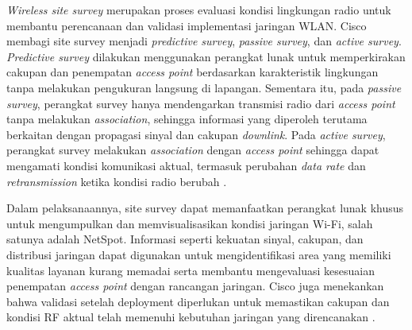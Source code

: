 \textit{Wireless site survey} merupakan proses evaluasi kondisi lingkungan radio untuk membantu perencanaan dan validasi implementasi jaringan WLAN. Cisco membagi site survey menjadi \textit{predictive survey}, \textit{passive survey}, dan \textit{active survey}. \textit{Predictive survey} dilakukan menggunakan perangkat lunak untuk memperkirakan cakupan dan penempatan \textit{access point} berdasarkan karakteristik lingkungan tanpa melakukan pengukuran langsung di lapangan. Sementara itu, pada \textit{passive survey}, perangkat survey hanya mendengarkan transmisi radio dari \textit{access point} tanpa melakukan \textit{association}, sehingga informasi yang diperoleh terutama berkaitan dengan propagasi sinyal dan cakupan \textit{downlink}. Pada \textit{active survey}, perangkat survey melakukan \textit{association} dengan \textit{access point} sehingga dapat mengamati kondisi komunikasi aktual, termasuk perubahan \textit{data rate} dan \textit{retransmission} ketika kondisi radio berubah \parencite{CISCO_SITE_SURVEY}.

Dalam pelaksanaannya, site survey dapat memanfaatkan perangkat lunak khusus untuk mengumpulkan dan memvisualisasikan kondisi jaringan Wi-Fi, salah satunya adalah NetSpot. Informasi seperti kekuatan sinyal, cakupan, dan distribusi jaringan dapat digunakan untuk mengidentifikasi area yang memiliki kualitas layanan kurang memadai serta membantu mengevaluasi kesesuaian penempatan \textit{access point} dengan rancangan jaringan. Cisco juga menekankan bahwa validasi setelah deployment diperlukan untuk memastikan cakupan dan kondisi RF aktual telah memenuhi kebutuhan jaringan yang direncanakan \parencite{CISCO_SITE_SURVEY}.
